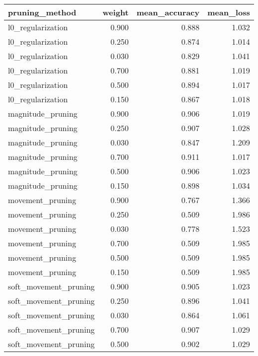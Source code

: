 \begin{tabular}{lrrr}
\toprule
       pruning\_method &  weight &  mean\_accuracy &  mean\_loss \\
\midrule
    l0\_regularization &   0.900 &          0.888 &      1.032 \\
    l0\_regularization &   0.250 &          0.874 &      1.014 \\
    l0\_regularization &   0.030 &          0.829 &      1.041 \\
    l0\_regularization &   0.700 &          0.881 &      1.019 \\
    l0\_regularization &   0.500 &          0.894 &      1.017 \\
    l0\_regularization &   0.150 &          0.867 &      1.018 \\
    magnitude\_pruning &   0.900 &          0.906 &      1.019 \\
    magnitude\_pruning &   0.250 &          0.907 &      1.028 \\
    magnitude\_pruning &   0.030 &          0.847 &      1.209 \\
    magnitude\_pruning &   0.700 &          0.911 &      1.017 \\
    magnitude\_pruning &   0.500 &          0.906 &      1.023 \\
    magnitude\_pruning &   0.150 &          0.898 &      1.034 \\
     movement\_pruning &   0.900 &          0.767 &      1.366 \\
     movement\_pruning &   0.250 &          0.509 &      1.986 \\
     movement\_pruning &   0.030 &          0.778 &      1.523 \\
     movement\_pruning &   0.700 &          0.509 &      1.985 \\
     movement\_pruning &   0.500 &          0.509 &      1.985 \\
     movement\_pruning &   0.150 &          0.509 &      1.985 \\
soft\_movement\_pruning &   0.900 &          0.905 &      1.023 \\
soft\_movement\_pruning &   0.250 &          0.896 &      1.041 \\
soft\_movement\_pruning &   0.030 &          0.864 &      1.061 \\
soft\_movement\_pruning &   0.700 &          0.907 &      1.029 \\
soft\_movement\_pruning &   0.500 &          0.902 &      1.029 \\

\end{tabular}

